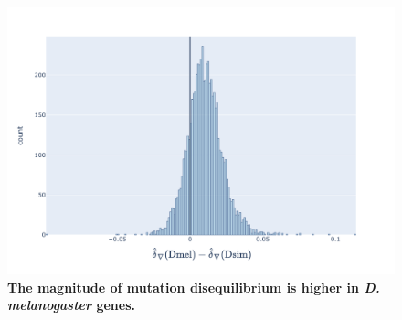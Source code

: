 \begin{figure}[h]
\centering
\includegraphics[width=	\textwidth]{figures/plots/drosophila/d-conv-diff.pdf}
\caption{\textbf{The magnitude of mutation disequilibrium is higher in \textit{D. melanogaster} genes.} }
\label{fig:drosophila_d-conv-diff}
\end{figure}
